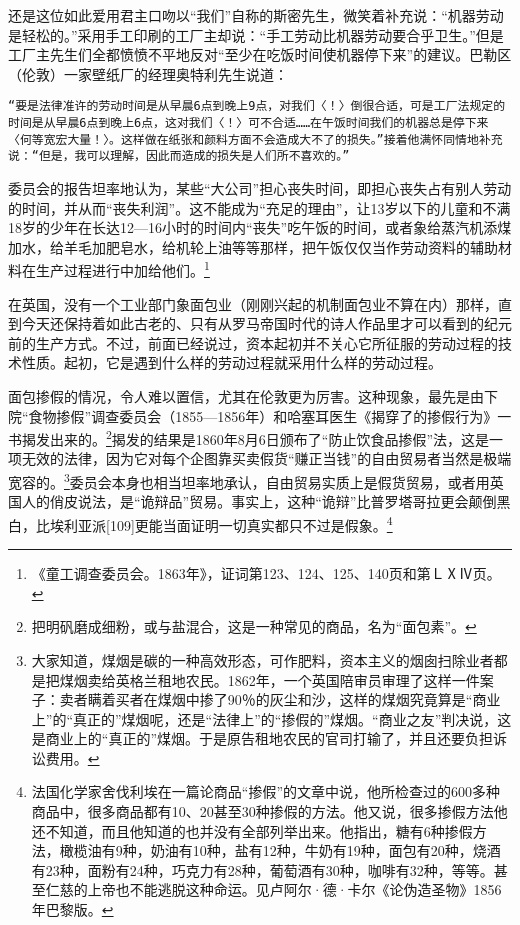 \documentclass{ctexbook}
\begin{document}
    还是这位如此爱用君主口吻以“我们”自称的斯密先生，微笑着补充说：“机器劳动是轻松的。”采用手工印刷的工厂主却说：“手工劳动比机器劳动要合乎卫生。”但是工厂主先生们全都愤愤不平地反对“至少在吃饭时间使机器停下来”的建议。巴勒区（伦敦）一家壁纸厂的经理奥特利先生说道：

    \texttt{“要是法律准许的劳动时间是从早晨6点到晚上9点，对我们〈！〉倒很合适，可是工厂法规定的时间是从早晨6点到晚上6点，这对我们〈！〉可不合适……在午饭时间我们的机器总是停下来〈何等宽宏大量！〉。这样做在纸张和颜料方面不会造成大不了的损失。”接着他满怀同情地补充说：“但是，我可以理解，因此而造成的损失是人们所不喜欢的。”}

    委员会的报告坦率地认为，某些“大公司”担心丧失时间，即担心丧失占有别人劳动的时间，并从而“丧失利润”。这不能成为“充足的理由”，让13岁以下的儿童和不满18岁的少年在长达12—16小时的时间内“丧失”吃午饭的时间，或者象给蒸汽机添煤加水，给羊毛加肥皂水，给机轮上油等等那样，把午饭仅仅当作劳动资料的辅助材料在生产过程进行中加给他们。\footnote{《童工调查委员会。1863年》，证词第123、124、125、140页和第ＬⅩⅣ页。}

    在英国，没有一个工业部门象面包业（刚刚兴起的机制面包业不算在内）那样，直到今天还保持着如此古老的、只有从罗马帝国时代的诗人作品里才可以看到的纪元前的生产方式。不过，前面已经说过，资本起初并不关心它所征服的劳动过程的技术性质。起初，它是遇到什么样的劳动过程就采用什么样的劳动过程。

    面包掺假的情况，令人难以置信，尤其在伦敦更为厉害。这种现象，最先是由下院“食物掺假”调查委员会（1855—1856年）和哈塞耳医生《揭穿了的掺假行为》一书揭发出来的。\footnote{把明矾磨成细粉，或与盐混合，这是一种常见的商品，名为“面包素”。}揭发的结果是1860年8月6日颁布了“防止饮食品掺假”法，这是一项无效的法律，因为它对每个企图靠买卖假货“赚正当钱”的自由贸易者当然是极端宽容的。\footnote{大家知道，煤烟是碳的一种高效形态，可作肥料，资本主义的烟囱扫除业者都是把煤烟卖给英格兰租地农民。1862年，一个英国陪审员审理了这样一件案子：卖者瞒着买者在煤烟中掺了90％的灰尘和沙，这样的煤烟究竟算是“商业上”的“真正的”煤烟呢，还是“法律上”的“掺假的”煤烟。“商业之友”判决说，这是商业上的“真正的”煤烟。于是原告租地农民的官司打输了，并且还要负担诉讼费用。}委员会本身也相当坦率地承认，自由贸易实质上是假货贸易，或者用英国人的俏皮说法，是“诡辩品”贸易。事实上，这种“诡辩”比普罗塔哥拉更会颠倒黑白，比埃利亚派[109]更能当面证明一切真实都只不过是假象。\footnote{法国化学家舍伐利埃在一篇论商品“掺假”的文章中说，他所检查过的600多种商品中，很多商品都有10、20甚至30种掺假的方法。他又说，很多掺假方法他还不知道，而且他知道的也并没有全部列举出来。他指出，糖有6种掺假方法，橄榄油有9种，奶油有10种，盐有12种，牛奶有19种，面包有20种，烧酒有23种，面粉有24种，巧克力有28种，葡萄酒有30种，咖啡有32种，等等。甚至仁慈的上帝也不能逃脱这种命运。见卢阿尔·德·卡尔《论伪造圣物》1856年巴黎版。}
\end{document}
